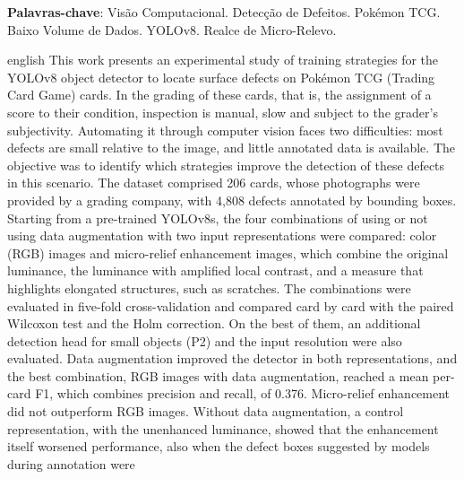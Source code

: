 \documentclass[
    12pt,                %
    openright,           %
    oneside,             %
    a4paper,             %
    english,             %
    brazil               %
]{abntex2}
\begin{document}
\begin{resumo}
\vspace{\onelineskip}

\noindent
\textbf{Palavras-chave}: Visão Computacional. Detecção de Defeitos.
Pokémon TCG. Baixo Volume de Dados. YOLOv8. Realce de Micro-Relevo.
\end{resumo}

\begin{resumo}[Abstract]
 \begin{otherlanguage*}{english}
   This work presents an experimental study of training strategies for
      the YOLOv8 object detector to locate surface defects on Pokémon TCG
      (Trading Card Game) cards. In the grading of these cards,
      that is, the assignment of a score to their condition,
      inspection is manual, slow and subject to the grader's
      subjectivity. Automating it through computer vision faces two
      difficulties: most defects are small relative to the image, and
      little annotated data is available. The objective was to identify
      which strategies improve the detection of these defects in
      this scenario. The dataset comprised 206 cards, whose photographs were
      provided by a grading company, with 4,808 defects
      annotated by bounding boxes. Starting from a pre-trained YOLOv8s, the four combinations of
      using or not using data augmentation with two input representations
      were compared: color (RGB) images and micro-relief enhancement
      images, which combine the original luminance, the luminance with
      amplified local contrast, and a measure that highlights elongated
      structures, such as scratches. The combinations were evaluated in
      five-fold cross-validation and compared card by card with the
      paired Wilcoxon test and the Holm correction.
      On the best of them, an additional detection head for small objects
      (P2) and the input resolution were also evaluated. Data augmentation
      improved the detector in both representations, and the best
      combination, RGB images with data augmentation, reached a mean
      per-card F1, which combines precision and recall, of 0.376. Micro-relief
      enhancement did not outperform RGB images. Without data augmentation,
      a control representation, with the unenhanced luminance, showed that
      the enhancement itself worsened performance, also when the
      defect boxes suggested by models during annotation were

\end{otherlanguage*}
\end{resumo}
\end{document}
